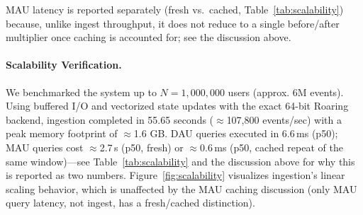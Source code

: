 \documentclass[sigconf,anonymous,review]{acmart}
\begin{document}
\begin{table}[H]
    \centering
    \caption{Ingest Throughput \& Peak Memory at Scale (1M Users, Single Node, Measured)}
    \label{tab:performance}
\end{table}

MAU latency is reported separately (fresh vs.\ cached, Table~\ref{tab:scalability}) because, unlike ingest throughput, it does not reduce to a single before/after multiplier once caching is accounted for; see the discussion above.

\paragraph{Scalability Verification.} We benchmarked the system up to $N=1,000,000$ users (approx. 6M events). Using buffered I/O and vectorized state updates with the exact 64-bit Roaring backend, ingestion completed in 55.65 seconds ($\approx$107,800 events/sec) with a peak memory footprint of $\approx$1.6 GB. DAU queries executed in 6.6\,ms (p50); MAU queries cost $\approx$2.7\,s (p50, fresh) or $\approx$0.6\,ms (p50, cached repeat of the same window)---see Table~\ref{tab:scalability} and the discussion above for why this is reported as two numbers. Figure~\ref{fig:scalability} visualizes ingestion's linear scaling behavior, which is unaffected by the MAU caching discussion (only MAU query latency, not ingest, has a fresh/cached distinction).
\end{document}
